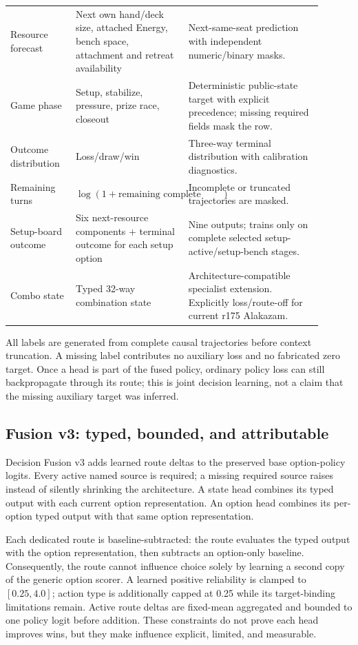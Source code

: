 \documentclass[10pt]{article}
\begin{document}
\begin{longtable}{>{\raggedright\arraybackslash}p{0.19\linewidth}>{\raggedright\arraybackslash}p{0.32\linewidth}>{\raggedright\arraybackslash}p{0.39\linewidth}}
Resource forecast & Next own hand/deck size, attached Energy, bench space, attachment and retreat availability & Next-same-seat prediction with independent numeric/binary masks. \\
Game phase & Setup, stabilize, pressure, prize race, closeout & Deterministic public-state target with explicit precedence; missing required fields mask the row. \\
Outcome distribution & Loss/draw/win & Three-way terminal distribution with calibration diagnostics. \\
Remaining turns & $\log(1+\text{remaining complete turns})$ & Incomplete or truncated trajectories are masked. \\
Setup-board outcome & Six next-resource components + terminal outcome for each setup option & Nine outputs; trains only on complete selected setup-active/setup-bench stages. \\
Combo state & Typed 32-way combination state & Architecture-compatible specialist extension. Explicitly loss/route-off for current r175 Alakazam. \\
\bottomrule
\end{longtable}
\normalsize

All labels are generated from complete causal trajectories before context truncation. A missing label contributes no auxiliary loss and no fabricated zero target. Once a head is part of the fused policy, ordinary policy loss can still backpropagate through its route; this is joint decision learning, not a claim that the missing auxiliary target was inferred.

\subsection{Fusion v3: typed, bounded, and attributable}

Decision Fusion v3 adds learned route deltas to the preserved base option-policy logits. Every active named source is required; a missing required source raises instead of silently shrinking the architecture. A state head combines its typed output with each current option representation. An option head combines its per-option typed output with that same option representation.

Each dedicated route is baseline-subtracted: the route evaluates the typed output with the option representation, then subtracts an option-only baseline. Consequently, the route cannot influence choice solely by learning a second copy of the generic option scorer. A learned positive reliability is clamped to $[0.25,4.0]$; action type is additionally capped at 0.25 while its target-binding limitations remain. Active route deltas are fixed-mean aggregated and bounded to one policy logit before addition. These constraints do not prove each head improves wins, but they make influence explicit, limited, and measurable.
\end{document}
